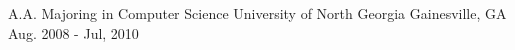 


\begin{cventries}


\cventry
{A.A. Majoring in Computer Science} %
{University of North Georgia} %
{Gainesville, GA} %
{Aug. 2008 - Jul, 2010} %
{ %
\begin{cvitems}
\end{cvitems}
}


\end{cventries}